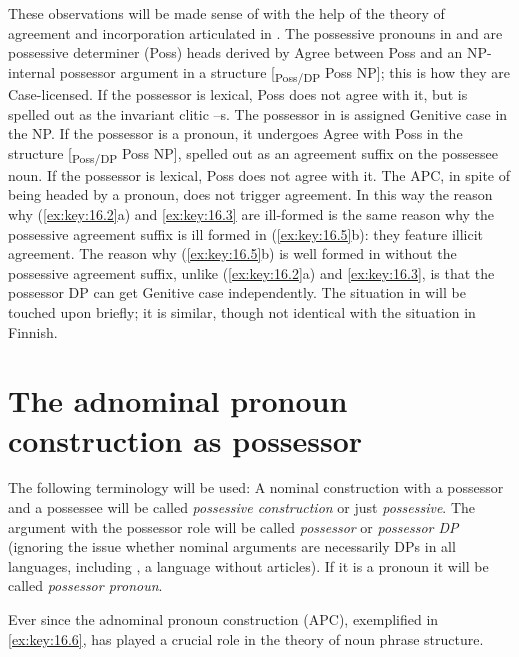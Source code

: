 \documentclass[output=paper]{langsci/langscibook}
\begin{document}
These observations will be made sense of with the help of the theory of
agreement and incorporation articulated in \textcite{Roberts2010,Roberts2010b}.
The possessive pronouns in  and  are possessive determiner
(Poss) heads derived by Agree between Poss and an NP-internal possessor
argument in a structure [\textsubscript{Poss/DP} Poss NP]; this is how they are
Case-licensed. If the possessor is lexical, Poss does not agree with it, but is
spelled out as the invariant clitic –s. The possessor in  is
assigned Genitive case in the NP. If the possessor is a
pronoun, it undergoes Agree with Poss in the structure [\textsubscript{Poss/DP}
Poss NP], spelled out as an agreement suffix on the possessee noun. If the
possessor is lexical, Poss does not agree with it. The \gls{APC}, in spite of being headed by a pronoun, does not trigger
agreement.  In this way the reason why (\ref{ex:key:16.2}a) and
\eqref{ex:key:16.3} are ill-formed is the same reason why the possessive
agreement suffix is ill formed in  (\ref{ex:key:16.5}b): they
feature illicit agreement. The reason why (\ref{ex:key:16.5}b) is well formed
in  without the possessive agreement suffix, unlike
(\ref{ex:key:16.2}a) and \eqref{ex:key:16.3}, is that the possessor DP can get
Genitive case independently. The situation in 
will be touched upon briefly; it is similar, though not identical with the
situation in Finnish.

\section{The adnominal pronoun construction as possessor}\label{sec:key:16.2}

The following terminology will be used: A nominal construction with a possessor
and a possessee will be called \emph{possessive construction} or just
\emph{possessive}. The argument with the possessor role will be called
\emph{possessor} or \emph{possessor DP} (ignoring the issue whether nominal
arguments are necessarily DPs in all languages, including , a language
without articles). If it is a pronoun it will be called \emph{possessor
pronoun}.

Ever since \citet{Postal1969} the adnominal pronoun construction (\gls{APC}),
exemplified in \eqref{ex:key:16.6}, has played a crucial role in the theory of
noun phrase structure.
\end{document}
